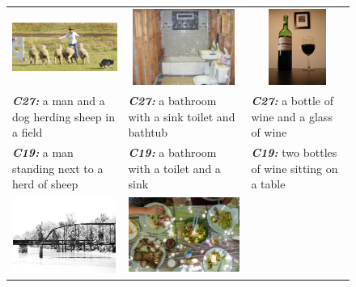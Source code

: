 \begin{figure}[bth]
  \begin{center}
  \newcommand{\mcCell}[1]{%
  \multicolumn{1}{c}{#1}}
  \centering
  \begin{adjustbox}{center}
  \tabcolsep=0.05cm
  \begin{tabular}{lll}
    \mcCell{\includegraphics[width=0.24\linewidth,height=2.5cm]{images/COCO_val2014_000000502766.jpg}} &
    \mcCell{\includegraphics[width=0.24\linewidth,height=2.5cm]{images/COCO_val2014_000000161720.jpg}} &
    \mcCell{\includegraphics[width=0.24\linewidth,height=2.5cm]{images/COCO_val2014_000000385707.jpg}} \\
    \textbf{\em\scriptsize C27:} \scriptsize a man and a dog herding sheep in a field &
    \textbf{\em\scriptsize C27:} \scriptsize a bathroom with a sink toilet and bathtub &
    \textbf{\em\scriptsize C27:} \scriptsize a bottle of wine and a glass of wine\\
    \textbf{\em\scriptsize C19:} \scriptsize a man standing next to a herd of sheep&
    \textbf{\em\scriptsize C19:} \scriptsize a bathroom with a toilet and a sink&
    \textbf{\em\scriptsize C19:} \scriptsize two bottles of wine sitting on a table\\
    \mcCell{\includegraphics[width=0.25\linewidth,height=2.5cm]{images/COCO_val2014_000000251330.jpg}} &
    \mcCell{\includegraphics[width=0.25\linewidth,height=2.5cm]{images/COCO_val2014_000000218404.jpg}} &

\end{tabular}
\end{adjustbox}
\end{center}
\end{figure}
